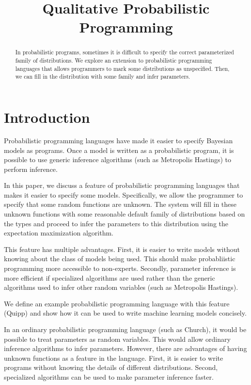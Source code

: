 \documentclass[proceed]{article}
\title{Qualitative Probabilistic Programming}
\author {}
\begin{document}
  \maketitle

  \begin{abstract}
    In probabilistic programs, sometimes it is difficult to specify the correct
    parameterized family of distributions.  We explore an extension to
    probabilistic programming languages that allows programmers to mark some
    distributions as unspecified.  Then, we can fill in the distribution with
    some family and infer parameters.
  \end{abstract}

  \section{Introduction}

  Probabilistic programming languages have made it easier to specify Bayesian
  models as programs.  Once a model is written as a probabilistic
  program, it is possible to use generic inference algorithms (such as
  Metropolis Hastings) to perform inference.

  In this paper, we discuss a feature of probabilistic programming languages
  that makes it easier to specify some models.
  Specifically, we allow the programmer to specify that some random functions
  are unknown.  The system will fill in these unknown functions with
  some reasonable default family of distributions based on the types and
  proceed to infer the parameters to this distribution using the
  expectation maximization algorithm.

  This feature has multiple advantages.  First, it is easier to write
  models without knowing about the class of models being used.  This should
  make probabliistic programming more accessible to non-experts.  Secondly,
  parameter inference is more efficient if specialized algorithms are used
  rather than the generic algorithms used to infer other random variables
  (such as Metropolis Hastings).

  We define an example probabilistic programming language with this feature
  (Quipp) and show how it can be used to write machine learning models
  concisely.

  In an ordinary probabilistic programming language (such as Church),
  it would be possible to treat parameters as random variables.  This
  would allow ordinary inference algorithms to infer parameters.  However,
  there are advantages of having unknown functions as a feature
  in the language.
  First, it is easier to
  write programs without knowing the details of different distributions.
  Second, specialized algorithms can be used to make parameter inference
  faster.
\end{document}
